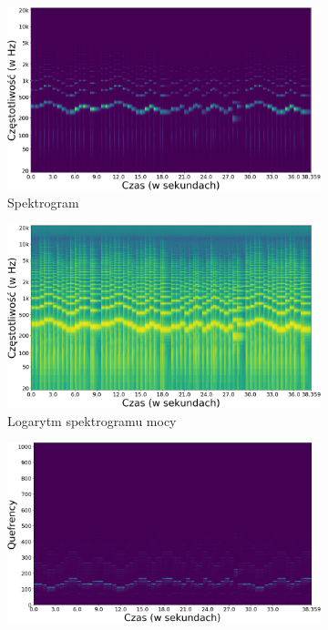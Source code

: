 \documentclass[12pt,a4paper,twoside]{mwart}
\begin{document}
\begin{figure}[t]
  \begin{subfigure}{.49\textwidth}
    \centering
    \includegraphics[width=1.\linewidth]{images/Cepstrum/spec_cropped.png}
    \caption{Spektrogram}
  \end{subfigure}
  \begin{subfigure}{.5\textwidth}
    \centering
    \includegraphics[width=1.\linewidth]{images/Cepstrum/log_pow_spec_cropped.png}
    \caption{Logarytm spektrogramu mocy}
  \end{subfigure}
  \newline
  \begin{subfigure}{.49\textwidth}
    \centering
    \includegraphics[width=1.\linewidth]{images/Cepstrum/cepstrogram_cropped.png}

\end{subfigure}
\end{figure}
\end{document}
